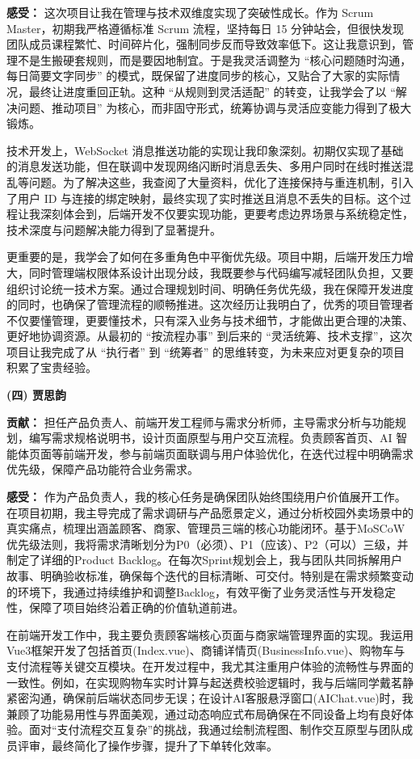 \textbf{感受：} 这次项目让我在管理与技术双维度实现了突破性成长。作为 Scrum Master，初期我严格遵循标准 Scrum 流程，坚持每日 15 分钟站会，但很快发现团队成员课程繁忙、时间碎片化，强制同步反而导致效率低下。这让我意识到，管理不是生搬硬套规则，而是要因地制宜。于是我灵活调整为 “核心问题随时沟通，每日简要文字同步” 的模式，既保留了进度同步的核心，又贴合了大家的实际情况，最终让进度重回正轨。这种 “从规则到灵活适配” 的转变，让我学会了以 “解决问题、推动项目” 为核心，而非固守形式，统筹协调与灵活应变能力得到了极大锻炼。

技术开发上，WebSocket 消息推送功能的实现让我印象深刻。初期仅实现了基础的消息发送功能，但在联调中发现网络闪断时消息丢失、多用户同时在线时推送混乱等问题。为了解决这些，我查阅了大量资料，优化了连接保持与重连机制，引入了用户 ID 与连接的绑定映射，最终实现了实时推送且消息不丢失的目标。这个过程让我深刻体会到，后端开发不仅要实现功能，更要考虑边界场景与系统稳定性，技术深度与问题解决能力得到了显著提升。

更重要的是，我学会了如何在多重角色中平衡优先级。项目中期，后端开发压力增大，同时管理端权限体系设计出现分歧，我既要参与代码编写减轻团队负担，又要组织讨论统一技术方案。通过合理规划时间、明确任务优先级，我在保障开发进度的同时，也确保了管理流程的顺畅推进。这次经历让我明白了，优秀的项目管理者不仅要懂管理，更要懂技术，只有深入业务与技术细节，才能做出更合理的决策、更好地协调资源。从最初的 “按流程办事” 到后来的 “灵活统筹、技术支撑”，这次项目让我完成了从 “执行者” 到 “统筹者” 的思维转变，为未来应对更复杂的项目积累了宝贵经验。

\textbf{}

\noindent \textbf{(四) 贾思韵}

\textbf{贡献：} 担任产品负责人、前端开发工程师与需求分析师，主导需求分析与功能规划，编写需求规格说明书，设计页面原型与用户交互流程。负责顾客首页、AI 智能体页面等前端开发，参与前端页面联调与用户体验优化，在迭代过程中明确需求优先级，保障产品功能符合业务需求。

\textbf{感受：} 作为产品负责人，我的核心任务是确保团队始终围绕用户价值展开工作。在项目初期，我主导完成了需求调研与产品愿景定义，通过分析校园外卖场景中的真实痛点，梳理出涵盖顾客、商家、管理员三端的核心功能闭环。基于MoSCoW优先级法则，我将需求清晰划分为P0（必须）、P1（应该）、P2（可以）三级，并制定了详细的Product Backlog。在每次Sprint规划会上，我与团队共同拆解用户故事、明确验收标准，确保每个迭代的目标清晰、可交付。特别是在需求频繁变动的环境下，我通过持续维护和调整Backlog，有效平衡了业务灵活性与开发稳定性，保障了项目始终沿着正确的价值轨道前进。

在前端开发工作中，我主要负责顾客端核心页面与商家端管理界面的实现。我运用Vue3框架开发了包括首页(Index.vue)、商铺详情页(BusinessInfo.vue)、购物车与支付流程等关键交互模块。在开发过程中，我尤其注重用户体验的流畅性与界面的一致性。例如，在实现购物车实时计算与起送费校验逻辑时，我与后端同学戴茗静紧密沟通，确保前后端状态同步无误；在设计AI客服悬浮窗口(AIChat.vue)时，我兼顾了功能易用性与界面美观，通过动态响应式布局确保在不同设备上均有良好体验。面对“支付流程交互复杂”的挑战，我通过绘制流程图、制作交互原型与团队成员评审，最终简化了操作步骤，提升了下单转化效率。


